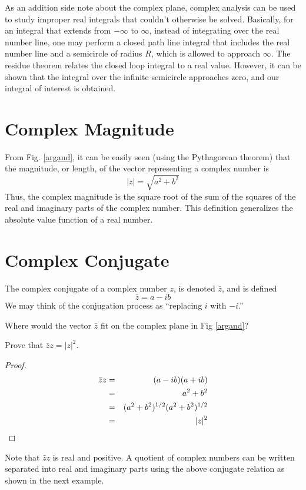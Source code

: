 As an addition side note about the 
complex plane, complex analysis can be used to study
improper real integrals that couldn't otherwise be
solved.  Basically, for an integral that extends from
$-\infty$ to $\infty$, instead of integrating over
the real number line, one may perform a closed path line
integral that includes the real number line and a semicircle
of radius $R$, which is allowed to approach $\infty$.
The residue theorem relates the closed loop integral
to a real value.  However, it can be shown that the
integral over the infinite semicircle approaches zero,
and our integral of interest is obtained.

\section{Complex Magnitude}
From Fig. \ref{argand}, it can be easily seen (using the Pythagorean theorem) 
that the magnitude, or length, of the vector representing
a complex number is
\begin{equation}
|z| = \sqrt{a^2 + b^2}
\end{equation}
Thus, the complex magnitude is the 
square root of the sum of the squares of the real 
and imaginary parts of the complex number.
This definition generalizes the absolute value
function of a real number.

\section{Complex Conjugate}
The complex conjugate of a complex number $z$, is denoted
$\bar{z}$, and is defined
\[
\bar{z} = a - i b
\label{zconjrect}
\]
We may think of the conjugation process as
``replacing $i$ with $-i$.''

Where would the vector $\bar{z}$ fit on the complex plane in Fig \ref{argand}?

\begin{example}
Prove that $\bar{z}z = |z|^2$.
\end{example}
\begin{proof}
\begin{eqnarray*}
\bar{z}z &=& (a - ib)(a+ib) \\
&=& a^2 + b^2 \\
&=& (a^2 + b^2)^{1/2} (a^2 + b^2)^{1/2} \\
&=& \samepage |z|^2
\end{eqnarray*}
\end{proof}
Note that $\bar{z}z$ is real and positive.  A quotient of complex numbers can 
be written separated 
into real and imaginary parts using the above conjugate relation
as shown in the next example.

